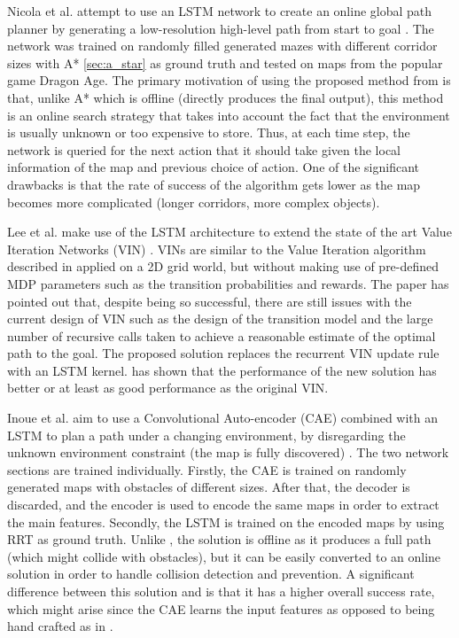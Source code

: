 Nicola et al. attempt to use an LSTM network to create an online global path planner by generating a low-resolution high-level path from start to goal \cite{nicola2018lstm}. The network was trained on randomly filled generated mazes with different corridor sizes with A* \ref{sec:a_star} as ground truth and tested on maps from the popular game Dragon Age. The primary motivation of using the proposed method from \cite{nicola2018lstm} is that, unlike A* which is offline (directly produces the final output), this method is an online search strategy that takes into account the fact that the environment is usually unknown or too expensive to store. Thus, at each time step, the network is queried for the next action that it should take given the local information of the map and previous choice of action. One of the significant drawbacks is that the rate of success of the algorithm gets lower as the map becomes more complicated (longer corridors, more complex objects).

Lee et al. make use of the LSTM architecture to extend the state of the art Value Iteration Networks (VIN) \cite{lee2018lstm}. VINs are similar to the Value Iteration algorithm described in \label{sec:vin} applied on a 2D grid world, but without making use of pre-defined MDP parameters such as the transition probabilities and rewards. The paper has pointed out that, despite being so successful, there are still issues with the current design of VIN such as the design of the transition model and the large number of recursive calls taken to achieve a reasonable estimate of the optimal path to the goal. The proposed solution replaces the recurrent VIN update rule with an LSTM kernel. \cite{lee2018lstm} has shown that the performance of the new solution has better or at least as good performance as the original VIN.

Inoue et al. aim to use a Convolutional Auto-encoder (CAE) combined with an LSTM to plan a path under a changing environment, by disregarding the unknown environment constraint (the map is fully discovered) \cite{inoue2019robot}. The two network sections are trained individually. Firstly, the CAE is trained on randomly generated maps with obstacles of different sizes. After that, the decoder is discarded, and the encoder is used to encode the same maps in order to extract the main features. Secondly, the LSTM is trained on the encoded maps by using RRT as ground truth. Unlike \cite{nicola2018lstm}, the solution is offline as it produces a full path (which might collide with obstacles), but it can be easily converted to an online solution in order to handle collision detection and prevention. A significant difference between this solution and \cite{nicola2018lstm} is that it has a higher overall success rate, which might arise since the CAE learns the input features as opposed to being hand crafted as in \cite{nicola2018lstm}.


